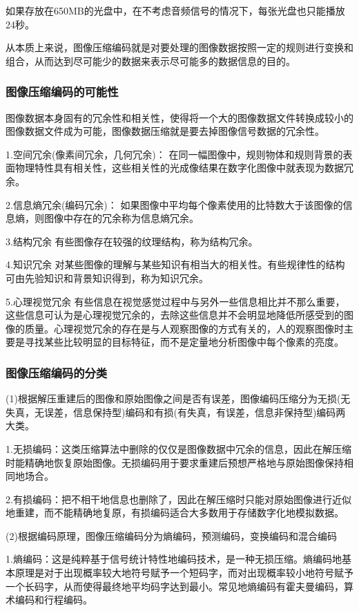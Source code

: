 \documentclass[11pt]{article}
\begin{document}
如果存放在650MB的光盘中，在不考虑音频信号的情况下，每张光盘也只能播放24秒。

从本质上来说，图像压缩编码就是对要处理的图像数据按照一定的规则进行变换和组合，从而达到尽可能少的数据来表示尽可能多的数据信息的目的。

\subsubsection{图像压缩编码的可能性}
图像数据本身固有的冗余性和相关性，使得将一个大的图像数据文件转换成较小的图像数据文件成为可能，图像数据压缩就是要去掉图像信号数据的冗余性。

1.空间冗余(像素间冗余，几何冗余)：
在同一幅图像中，规则物体和规则背景的表面物理特性具有相关性，这些相关性的光成像结果在数字化图像中就表现为数据冗余。

2.信息熵冗余(编码冗余)：
如果图像中平均每个像素使用的比特数大于该图像的信息熵，则图像中存在的冗余称为信息熵冗余。

3.结构冗余
有些图像存在较强的纹理结构，称为结构冗余。

4.知识冗余
对某些图像的理解与某些知识有相当大的相关性。有些规律性的结构可由先验知识和背景知识得到，称为知识冗余。

5.心理视觉冗余
有些信息在视觉感觉过程中与另外一些信息相比并不那么重要，这些信息可认为是心理视觉冗余的，去除这些信息并不会明显地降低所感受到的图像的质量。心理视觉冗余的存在是与人观察图像的方式有关的，人的观察图像时主要是寻找某些比较明显的目标特征，而不是定量地分析图像中每个像素的亮度。

\subsubsection{图像压缩编码的分类}
(1)根据解压重建后的图像和原始图像之间是否有误差，图像编码压缩分为无损(无失真，无误差，信息保持型)编码和有损(有失真，有误差，信息非保持型)编码两大类。

1.无损编码：这类压缩算法中删除的仅仅是图像数据中冗余的信息，因此在解压缩时能精确地恢复原始图像。无损编码用于要求重建后预想严格地与原始图像保持相同地场合。

2.有损编码：把不相干地信息也删除了，因此在解压缩时只能对原始图像进行近似地重建，而不能精确地复原，有损编码适合大多数用于存储数字化地模拟数据。

(2)根据编码原理，图像压缩编码分为熵编码，预测编码，变换编码和混合编码

1.熵编码：这是纯粹基于信号统计特性地编码技术，是一种无损压缩。熵编码地基本原理是对于出现概率较大地符号赋予一个短码字，而对出现概率较小地符号赋予一个长码字，从而使得最终地平均码字达到最小。常见地熵编码有霍夫曼编码，算术编码和行程编码。
\end{document}
